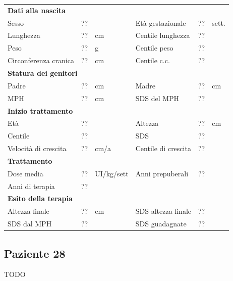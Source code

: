 \begin{table}[!h]
\begin{tabular}{lrllrl}
\toprule
\multicolumn{6}{l}{\textbf{Dati alla nascita}}\\
Sesso 		& \multicolumn{2}{l}{??} 	& Età gestazionale 		& ?? 		& sett.\\
Lunghezza 	& ?? 		& cm 				& Centile lunghezza		& ?? 		\\
Peso 		& ?? 		& g					& Centile peso			& ?? 		\\
Circonferenza cranica	& ?? 		& cm 	& Centile c.c.			& ?? \\
\midrule
\multicolumn{6}{l}{\textbf{Statura dei genitori}}\\
Padre 		& ?? & cm 	& Madre 				& ?? & cm \\
MPH 		& ?? & cm 	& SDS del MPH 			& ??\\
\midrule
\multicolumn{6}{l}{\textbf{Inizio trattamento}} \\
Età	& ?? & 		& Altezza 				& ?? & cm  \\
Centile & ?? 	 &		& SDS		& ?? \\
Velocità di crescita & ?? & cm/a	& Centile di crescita & ??\\
\midrule
\multicolumn{6}{l}{\textbf{Trattamento}} \\
Dose media		& ?? & UI/kg/sett & Anni prepuberali & ??\\
Anni di terapia & ??\\
\midrule
\multicolumn{6}{l}{\textbf{Esito della terapia}} \\
Altezza finale			& ?? & cm 	& SDS altezza finale		& ??\\
SDS dal MPH				& ?? &		& SDS guadagnate 			& ??\\
\bottomrule
\end{tabular}
\end{table}
\clearpage


\subsection*{Paziente 28}

TODO

